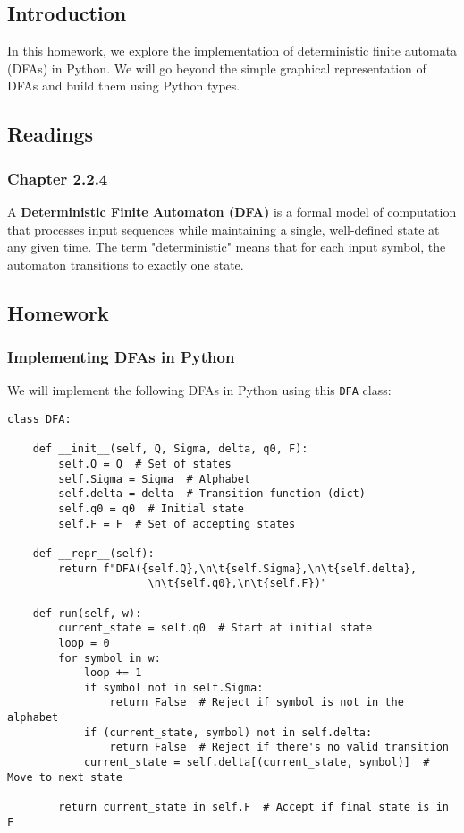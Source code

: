 \documentclass{article}
\theoremstyle{theorem}
\theoremstyle{definition}
\theoremstyle{remark}
\begin{document}
\subsection{Introduction}
In this homework, we explore the implementation of deterministic finite automata (DFAs) in Python. We will go beyond the simple graphical representation of DFAs and build them using Python types.

\subsection{Readings}
\subsubsection*{Chapter 2.2.4}
A \textbf{Deterministic Finite Automaton (DFA)} is a formal model of computation that processes input sequences while maintaining a single, well-defined state at any given time. The term "deterministic" means that for each input symbol, the automaton transitions to exactly one state.


\subsection{Homework}

\subsubsection*{Implementing DFAs in Python}
We will implement the following DFAs in Python using this \texttt{DFA} class:

\begin{verbatim}
class DFA:

    def __init__(self, Q, Sigma, delta, q0, F):
        self.Q = Q  # Set of states
        self.Sigma = Sigma  # Alphabet
        self.delta = delta  # Transition function (dict)
        self.q0 = q0  # Initial state
        self.F = F  # Set of accepting states

    def __repr__(self):
        return f"DFA({self.Q},\n\t{self.Sigma},\n\t{self.delta},
                      \n\t{self.q0},\n\t{self.F})"

    def run(self, w):
        current_state = self.q0  # Start at initial state
        loop = 0
        for symbol in w:
            loop += 1
            if symbol not in self.Sigma:
                return False  # Reject if symbol is not in the alphabet
            if (current_state, symbol) not in self.delta:
                return False  # Reject if there's no valid transition
            current_state = self.delta[(current_state, symbol)]  # Move to next state
        
        return current_state in self.F  # Accept if final state is in F
\end{verbatim}
\end{document}
